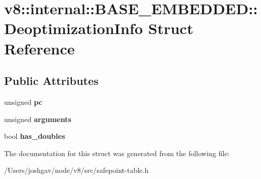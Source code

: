 \hypertarget{structv8_1_1internal_1_1_b_a_s_e___e_m_b_e_d_d_e_d_1_1_deoptimization_info}{}\section{v8\+:\+:internal\+:\+:B\+A\+S\+E\+\_\+\+E\+M\+B\+E\+D\+D\+ED\+:\+:Deoptimization\+Info Struct Reference}
\label{structv8_1_1internal_1_1_b_a_s_e___e_m_b_e_d_d_e_d_1_1_deoptimization_info}
\subsection*{Public Attributes}
\begin{DoxyCompactItemize}
\item 
unsigned {\bfseries pc}\hypertarget{structv8_1_1internal_1_1_b_a_s_e___e_m_b_e_d_d_e_d_1_1_deoptimization_info_a21b3cde264091ee91f29eabc90ff0673}{}\label{structv8_1_1internal_1_1_b_a_s_e___e_m_b_e_d_d_e_d_1_1_deoptimization_info_a21b3cde264091ee91f29eabc90ff0673}

\item 
unsigned {\bfseries arguments}\hypertarget{structv8_1_1internal_1_1_b_a_s_e___e_m_b_e_d_d_e_d_1_1_deoptimization_info_ad70b64a0eb844afee1784dbb7fbdf039}{}\label{structv8_1_1internal_1_1_b_a_s_e___e_m_b_e_d_d_e_d_1_1_deoptimization_info_ad70b64a0eb844afee1784dbb7fbdf039}

\item 
bool {\bfseries has\+\_\+doubles}\hypertarget{structv8_1_1internal_1_1_b_a_s_e___e_m_b_e_d_d_e_d_1_1_deoptimization_info_a9904d907eb74bb1d16c2553f506cae0d}{}\label{structv8_1_1internal_1_1_b_a_s_e___e_m_b_e_d_d_e_d_1_1_deoptimization_info_a9904d907eb74bb1d16c2553f506cae0d}

\end{DoxyCompactItemize}


The documentation for this struct was generated from the following file\+:\begin{DoxyCompactItemize}
\item 
/\+Users/joshgav/node/v8/src/safepoint-\/table.\+h\end{DoxyCompactItemize}

